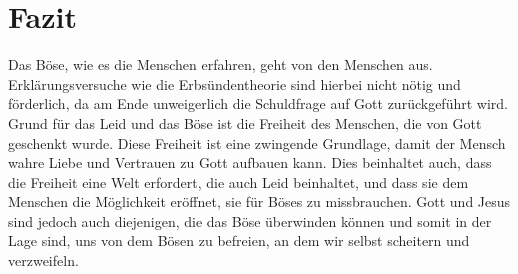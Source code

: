\section{Fazit}
Das Böse, wie es die Menschen erfahren, geht von den Menschen aus. Erklärungsversuche wie die Erbsündentheorie sind hierbei nicht nötig und förderlich, da am Ende unweigerlich die Schuldfrage auf Gott zurückgeführt wird. Grund für das Leid und das Böse ist die Freiheit des Menschen, die von Gott geschenkt wurde. Diese Freiheit ist eine zwingende Grundlage, damit der Mensch wahre Liebe und Vertrauen zu Gott aufbauen kann. Dies beinhaltet auch, dass die Freiheit eine Welt erfordert, die auch Leid beinhaltet, und dass sie dem Menschen die Möglichkeit eröffnet, sie für Böses zu missbrauchen. Gott und Jesus sind jedoch auch diejenigen, die das Böse überwinden können und somit in der Lage sind, uns von dem Bösen zu befreien, an dem wir selbst scheitern und verzweifeln. \\

\noindent{}
